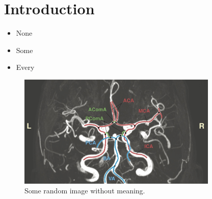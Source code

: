 

\section{Introduction}
\label{section1}
\kant[1]

\begin{itemize}
\item None
\item Some
\item Every
\end{itemize}

\kant[2]

\begin{figure}[h!]
    \centering
    \includegraphics[width=0.85\textwidth]{figures/cow_contrast_lowres.jpg}
    \caption{Some random image without meaning.}
    \label{fig:1:illustration}
\end{figure}
\newpage

\kant[1-2]

